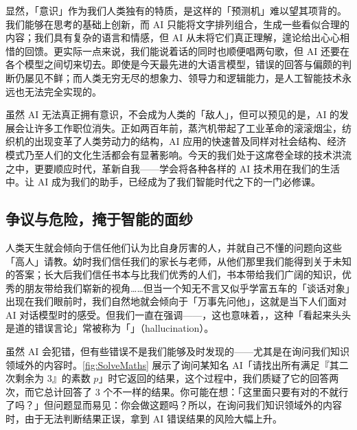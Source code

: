 显然，「意识」作为我们人类独有的特质，是这样的「预测机」难以望其项背的。我们能够在思考的基础上创新，而 AI 只能将文字排列组合，生成一些看似合理的内容；我们具有复杂的语言和情感，但 AI 从未将它们真正理解，遑论给出心心相惜的回馈。更实际一点来说，我们能说着话的同时也顺便唱两句歌，但 AI 还要在各个模型之间切来切去。即使是今天最先进的大语言模型，错误的回答与偏颇的判断仍屡见不鲜；而人类无穷无尽的想象力、领导力和逻辑能力，是人工智能技术永远也无法完全实现的。

虽然 AI 无法真正拥有意识，不会成为人类的「敌人」，但可以预见的是，AI 的发展会让许多工作职位消失。正如两百年前，蒸汽机带起了工业革命的滚滚烟尘，纺织机的出现变革了人类劳动力的结构，AI 应用的快速普及同样对社会结构、经济模式乃至人们的文化生活都会有显著影响。今天的我们处于这席卷全球的技术洪流之中，更要顺应时代，革新自我——学会将各种各样的 AI 技术用在我们的生活中。让 AI 成为我们的助手，已经成为了我们智能时代之下的一门必修课。

\subsection{争议与危险，掩于智能的面纱}

人类天生就会倾向于信任他们认为比自身厉害的人，并就自己不懂的问题向这些「高人」请教。幼时我们信任我们的家长与老师，从他们那里我们能得到关于未知的答案；长大后我们信任书本与比我们优秀的人们，书本带给我们广阔的知识，优秀的朋友带给我们崭新的视角……但当一个知无不言又似乎学富五车的「谈话对象」出现在我们眼前时，我们自然地就会倾向于「万事先问他」，这就是当下人们面对 AI 对话模型时的感受。但我们一直在强调——，这也意味着，，这种「看起来头头是道的错误言论」常被称为「」（hallucination）。

虽然 AI 会犯错，但有些错误不是我们能够及时发现的——尤其是在询问我们知识领域外的内容时。\autoref{fig:SolveMaths} 展示了询问某知名 AI「请找出所有满足『其二次剩余为 3』的素数 $p$」时它返回的结果，这个过程中，我们质疑了它的回答两次，而它总计回答了 3 个不一样的结果。你可能在想：「这里面只要有对的不就行了吗？」但问题显而易见：你会做这题吗？所以，在询问我们知识领域外的内容时，由于无法判断结果正误，拿到 AI 错误结果的风险大幅上升。

